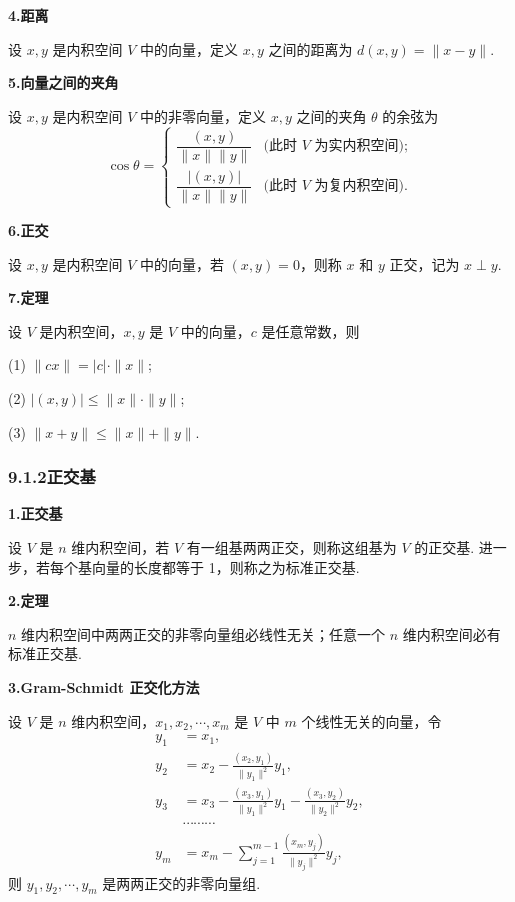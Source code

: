 \documentclass[UTF8,12pt,a4paper,fontset=fandol]{ctexart}
\begin{document}
\noindent\textbf{4.\quad 距离}

设 $x,y$ 是内积空间 $V$ 中的向量，定义 $x,y$ 之间的距离为 $d(x,y)=\|x-y\|$.

\noindent\textbf{5.\quad 向量之间的夹角}

设 $x,y$ 是内积空间 $V$ 中的非零向量，定义 $x,y$ 之间的夹角 $\theta$ 的余弦为
\[
\cos\theta=
\begin{cases}
\dfrac{(x,y)}{\|x\|\|y\|} & \text{(此时 $V$ 为实内积空间);} \\[1.2ex]
\dfrac{|(x,y)|}{\|x\|\|y\|} & \text{(此时 $V$ 为复内积空间).}
\end{cases}
\]

\noindent\textbf{6.\quad 正交}

设 $x,y$ 是内积空间 $V$ 中的向量，若 $(x,y)=0$，则称 $x$ 和 $y$ 正交，记为 $x\perp y$.

\noindent\textbf{7.\quad 定理}

设 $V$ 是内积空间，$x,y$ 是 $V$ 中的向量，$c$ 是任意常数，则

(1) $\|cx\|=|c|\cdot\|x\|$;

(2) $|(x,y)|\le \|x\|\cdot\|y\|$;

(3) $\|x+y\|\le \|x\|+\|y\|$.

\subsubsection*{9.1.2\quad 正交基}

\noindent\textbf{1.\quad 正交基}

设 $V$ 是 $n$ 维内积空间，若 $V$ 有一组基两两正交，则称这组基为 $V$ 的正交基. 进一步，若每个基向量的长度都等于 1，则称之为标准正交基.

\noindent\textbf{2.\quad 定理}

$n$ 维内积空间中两两正交的非零向量组必线性无关；任意一个 $n$ 维内积空间必有标准正交基.

\noindent\textbf{3.\quad Gram-Schmidt 正交化方法}

设 $V$ 是 $n$ 维内积空间，$x_1,x_2,\cdots,x_m$ 是 $V$ 中 $m$ 个线性无关的向量，令
\[
\begin{aligned}
y_1&=x_1,\\
y_2&=x_2-\frac{(x_2,y_1)}{\|y_1\|^2}y_1,\\
y_3&=x_3-\frac{(x_3,y_1)}{\|y_1\|^2}y_1-\frac{(x_3,y_2)}{\|y_2\|^2}y_2,\\
&\cdots\cdots\cdots\\
y_m&=x_m-\sum_{j=1}^{m-1}\frac{(x_m,y_j)}{\|y_j\|^2}y_j,
\end{aligned}
\]
则 $y_1,y_2,\cdots,y_m$ 是两两正交的非零向量组.
\end{document}
